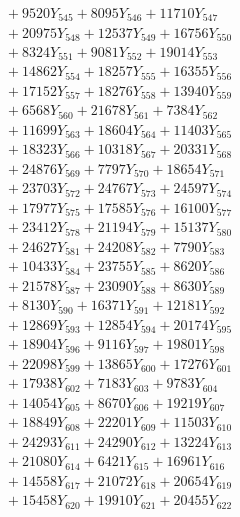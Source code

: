 \documentclass[a4paper,10pt]{article}
\begin{document}
{\begin{align}
&\;  + 9520 Y_{545} + 8095 Y_{546} + 11710 Y_{547} \\[0.3ex]
&\;  + 20975 Y_{548} + 12537 Y_{549} + 16756 Y_{550} \\[0.3ex]
&\;  + 8324 Y_{551} + 9081 Y_{552} + 19014 Y_{553} \\[0.3ex]
&\;  + 14862 Y_{554} + 18257 Y_{555} + 16355 Y_{556} \\[0.3ex]
&\;  + 17152 Y_{557} + 18276 Y_{558} + 13940 Y_{559} \\[0.3ex]
&\;  + 6568 Y_{560} + 21678 Y_{561} + 7384 Y_{562} \\[0.3ex]
&\;  + 11699 Y_{563} + 18604 Y_{564} + 11403 Y_{565} \\[0.3ex]
&\;  + 18323 Y_{566} + 10318 Y_{567} + 20331 Y_{568} \\[0.5ex]\allowbreak
&\;  + 24876 Y_{569} + 7797 Y_{570} + 18654 Y_{571} \\[0.3ex]
&\;  + 23703 Y_{572} + 24767 Y_{573} + 24597 Y_{574} \\[0.3ex]
&\;  + 17977 Y_{575} + 17585 Y_{576} + 16100 Y_{577} \\[0.3ex]
&\;  + 23412 Y_{578} + 21194 Y_{579} + 15137 Y_{580} \\[0.3ex]
&\;  + 24627 Y_{581} + 24208 Y_{582} + 7790 Y_{583} \\[0.3ex]
&\;  + 10433 Y_{584} + 23755 Y_{585} + 8620 Y_{586} \\[0.3ex]
&\;  + 21578 Y_{587} + 23090 Y_{588} + 8630 Y_{589} \\[0.3ex]
&\;  + 8130 Y_{590} + 16371 Y_{591} + 12181 Y_{592} \\[0.3ex]
&\;  + 12869 Y_{593} + 12854 Y_{594} + 20174 Y_{595} \\[0.3ex]
&\;  + 18904 Y_{596} + 9116 Y_{597} + 19801 Y_{598} \\[0.5ex]\allowbreak
&\;  + 22098 Y_{599} + 13865 Y_{600} + 17276 Y_{601} \\[0.3ex]
&\;  + 17938 Y_{602} + 7183 Y_{603} + 9783 Y_{604} \\[0.3ex]
&\;  + 14054 Y_{605} + 8670 Y_{606} + 19219 Y_{607} \\[0.3ex]
&\;  + 18849 Y_{608} + 22201 Y_{609} + 11503 Y_{610} \\[0.3ex]
&\;  + 24293 Y_{611} + 24290 Y_{612} + 13224 Y_{613} \\[0.3ex]
&\;  + 21080 Y_{614} + 6421 Y_{615} + 16961 Y_{616} \\[0.3ex]
&\;  + 14558 Y_{617} + 21072 Y_{618} + 20654 Y_{619} \\[0.3ex]
&\;  + 15458 Y_{620} + 19910 Y_{621} + 20455 Y_{622} \\[0.3ex]

\end{align}}
\end{document}
